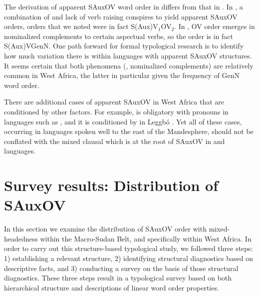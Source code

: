 \documentclass[output=paper,newtxmath,modfonts,nonflat,draftmode]{langsci/langscibook}
\begin{document}
The derivation of apparent SAuxOV word order in  differs from that in . In , a combination of  and lack of verb raising conspires to yield apparent SAuxOV orders, orders that we noted were in fact S(Aux)V$_1$OV$_2$. In , OV order emerges in nominalized complements to certain aspectual verbs, so the  order is in fact S(Aux)VGenN. One path forward for formal typological research is to identify how much variation there is within languages with apparent SAuxOV structures. It seems certain that both phenomena (, nominalized complements) are relatively common in West Africa, the latter in particular given the frequency of GenN word order.

There are additional cases of apparent SAuxOV in West Africa that are conditioned by other factors. For example,  is obligatory with pronouns in  languages such as  \citep{ikoro96}, and it is conditioned by  in Leggbó \citep{good07}. Yet all of these cases, occurring in languages spoken well to the east of the Mandesphere, should not be conflated with the mixed clausal  which is at the root of SAuxOV in  and  languages.


\section{Survey results: Distribution of SAuxOV}\label{sec:distribution}

In this section we examine the distribution of SAuxOV order with mixed-head\-ed\-ness within the Macro-Sudan Belt, and specifically within West Africa. In order to carry out this structure-based typological study, we followed three steps: 1) establishing a relevant structure, 2) identifying structural diagnostics based on descriptive facts, and 3) conducting a survey on the basis of those structural diagnostics. These three steps result in a typological survey based on both hierarchical structure and descriptions of linear word order properties. 
\end{document}

